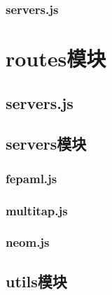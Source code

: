 \subsubsection{servers.js}

% 

\section{routes模块}
\subsection{servers.js}

\subsection{servers模块}
\subsubsection{fepaml.js}

\subsubsection{multitap.js}

\subsubsection{neom.js}

\subsection{utils模块}
